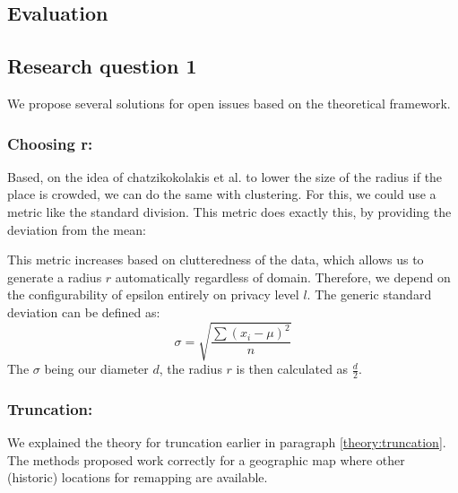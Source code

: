 \subsection{Evaluation}
\subsection{Research question 1}

We propose several solutions for open issues based on the theoretical framework. \newline
\subsubsection{Choosing r: } Based, on the idea of chatzikokolakis et al. to lower the size of the radius if the place is crowded, we can do the same with clustering.
For this, we could use a metric like the standard division.
This metric does exactly this, by providing the deviation from the mean:

This metric increases based on clutteredness of the data, which allows us to generate a radius $r$ automatically regardless of domain.
Therefore, we depend on the configurability of epsilon entirely on privacy level $l$.
The generic standard deviation can be defined as:
\begin{equation}
  \sigma = \sqrt{\frac{\sum{(x_i - \mu)^2}}{n}}
\end{equation}
The $\sigma$ being our diameter $d$, the radius $r$ is then calculated as $\frac{d}{2}$. \newline
\subsubsection{Truncation: }
We explained the theory for truncation earlier in paragraph \ref{theory:truncation}.
The methods proposed work correctly for a geographic map where other (historic) locations for remapping are available.

